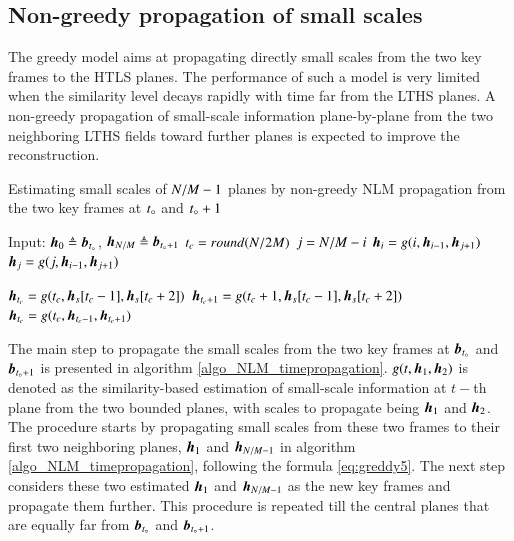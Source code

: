 \subsection{Non-greedy propagation of small scales}
The greedy model aims at propagating directly small scales from the two key frames to the HTLS planes. The performance of such a model is very limited when the similarity level decays rapidly with time far from the LTHS planes. A non-greedy propagation of small-scale information plane-by-plane from the two neighboring LTHS fields toward further planes is expected to improve the reconstruction. 

\begin{algorithm}[t]
\caption{Estimating small scales of $ N/M - 1 $ planes by non-greedy NLM propagation from the two key frames at $ t_{\circ} $ and $ t_{\circ}+1 $} \label{algo_NLM_timepropagation}
\begin{algorithmic}[1]
	\State Input: $ \operatorname{\boldsymbol{h}}_0 \triangleq \operatorname{\boldsymbol{b}}_{t_{\circ}} $, $  \operatorname{\boldsymbol{h}}_{N/M} \triangleq \operatorname{\boldsymbol{b}}_{t_{\circ}+1} $
	\State $ t_c = round(N/2M) $ 
		\State $ j = N/M - i$
		\State $ \operatorname{\boldsymbol{h}}_i = g(i, \operatorname{\boldsymbol{h}}_{i - 1},\operatorname{\boldsymbol{h}}_{j + 1})$
		\State $ \operatorname{\boldsymbol{h}}_j = g(j, \operatorname{\boldsymbol{h}}_{i - 1},\operatorname{\boldsymbol{h}}_{j + 1})$
	\EndFor
	
	 
		\State $ \operatorname{\boldsymbol{h}}_{t_c} = g(t_c, \operatorname{\boldsymbol{h}}_s[t_c-1],\operatorname{\boldsymbol{h}}_s[t_c+2])$
		\State $ \operatorname{\boldsymbol{h}}_{t_c+1} = g(t_c+1, \operatorname{\boldsymbol{h}}_s[t_c-1],\operatorname{\boldsymbol{h}}_s[t_c+2])$		
	\Else
		\State $ \operatorname{\boldsymbol{h}}_{t_c} = g(t_c, \operatorname{\boldsymbol{h}}_{t_c-1},\operatorname{\boldsymbol{h}}_{t_c+1})$ 	
	\EndIf	
\end{algorithmic}
\end{algorithm}

The main step to propagate the small scales from the two key frames at $ \operatorname{\boldsymbol{b}}_{t_{\circ}} $ and $ \operatorname{\boldsymbol{b}}_{t_{\circ}+1} $ is presented in algorithm \ref{algo_NLM_timepropagation}. $ g(t,\operatorname{\boldsymbol{h}}_1,\operatorname{\boldsymbol{h}}_2) $ is denoted as the similarity-based estimation of small-scale information at $ t- $th plane from the two bounded planes, with scales to propagate being $ \operatorname{\boldsymbol{h}}_1 $ and $ \operatorname{\boldsymbol{h}}_2 $. The procedure starts by propagating small scales from these two frames to their first two neighboring planes, $ \operatorname{\boldsymbol{h}}_1 $ and $ \operatorname{\boldsymbol{h}}_{N/M - 1} $ in algorithm \ref{algo_NLM_timepropagation}, following the formula \ref{eq:greddy5}. The next step considers these two estimated $ \operatorname{\boldsymbol{h}}_1 $ and $ \operatorname{\boldsymbol{h}}_{N/M - 1} $ as the new key frames and propagate them further. This procedure is repeated till the central planes that are equally far from $ \operatorname{\boldsymbol{b}}_{t_{\circ}} $ and $ \operatorname{\boldsymbol{b}}_{t_{\circ}+1} $.

